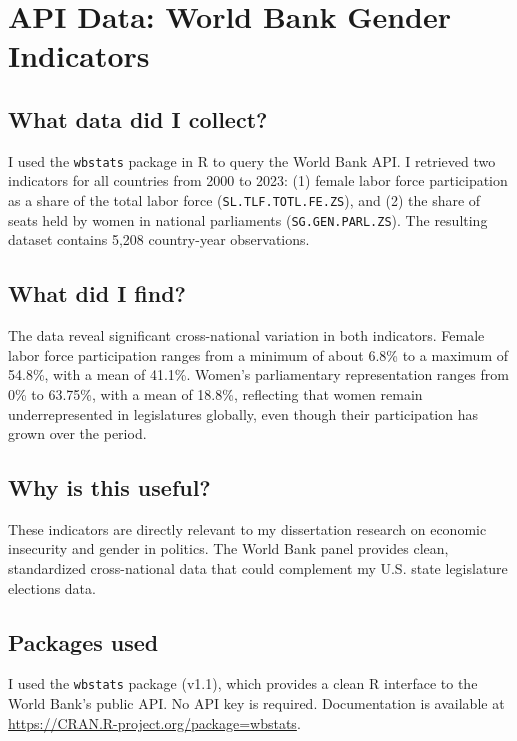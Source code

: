 \documentclass[12pt]{article}
\begin{document}
\section{API Data: World Bank Gender Indicators}

\subsection*{What data did I collect?}
I used the \texttt{wbstats} package in R to query the World Bank
API. I retrieved two indicators for all countries from 2000 to
2023: (1) female labor force participation as a share of the total
labor force (\texttt{SL.TLF.TOTL.FE.ZS}), and (2) the share of
seats held by women in national parliaments
(\texttt{SG.GEN.PARL.ZS}). The resulting dataset contains 5,208
country-year observations.

\subsection*{What did I find?}
The data reveal significant cross-national variation in both
indicators. Female labor force participation ranges from a minimum
of about 6.8\% to a maximum of 54.8\%, with a mean of 41.1\%.
Women's parliamentary representation ranges from 0\% to 63.75\%,
with a mean of 18.8\%, reflecting that women remain
underrepresented in legislatures globally, even though their participation
has grown over the period. 

\subsection*{Why is this useful?}
These indicators are directly relevant to my dissertation research
on economic insecurity and gender in politics. The World Bank
panel provides clean, standardized cross-national data that could
complement my U.S. state legislature elections data. 

\subsection*{Packages used}
I used the \texttt{wbstats} package (v1.1), which provides a clean
R interface to the World Bank's public API. No API key is required.
Documentation is available at
\url{https://CRAN.R-project.org/package=wbstats}.
\end{document}

